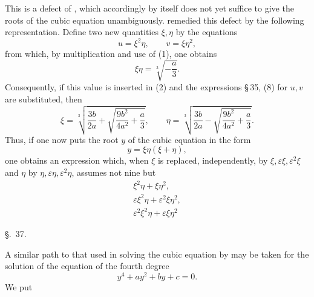 
This is a defect of , which accordingly by itself does not yet suffice to give the roots of the cubic equation unambiguously.  remedied this defect by the following representation. Define two new quantities $\xi,\eta$ by the equations
\begin{equation}
u=\xi^2\eta,
\qquad
v=\xi\eta^2,
\tag{2}
\end{equation}
from which, by multiplication and use of (1), one obtains
\begin{equation}
\xi\eta=\sqrt[3]{-\frac a3}.
\tag{3}
\end{equation}
Consequently, if this value is inserted in (2) and the expressions \S\,35, (8) for $u,v$ are substituted, then
\begin{equation}
\xi=\sqrt[3]{\frac{3b}{2a}+\sqrt{\frac{9b^2}{4a^2}+\frac a3}},\qquad
\eta=\sqrt[3]{\frac{3b}{2a}-\sqrt{\frac{9b^2}{4a^2}+\frac a3}}.
\tag{4}
\end{equation}
Thus, if one now puts the root $y$ of the cubic equation in the form
\begin{equation}
y=\xi\eta(\xi+\eta),
\tag{5}
\end{equation}
one obtains an expression which, when $\xi$ is replaced, independently, by $\xi,\varepsilon\xi,\varepsilon^2\xi$ and $\eta$ by $\eta,\varepsilon\eta,\varepsilon^2\eta$, assumes not nine but \footnotemark
\[
\begin{array}{c}
\xi^2\eta+\xi\eta^2,\\
\varepsilon\xi^2\eta+\varepsilon^2\xi\eta^2,\\
\varepsilon^2\xi^2\eta+\varepsilon\xi\eta^2
\end{array}
\]



\begin{center}
{\large \S.\ 37.}

\vspace{0.5em}
{\large{}}
\end{center}

A similar path to that used in solving the cubic equation by  may be taken for the solution of the equation of the fourth degree
\begin{equation}
 y^4+ay^2+by+c=0.
\tag{1}
\end{equation}
We put
